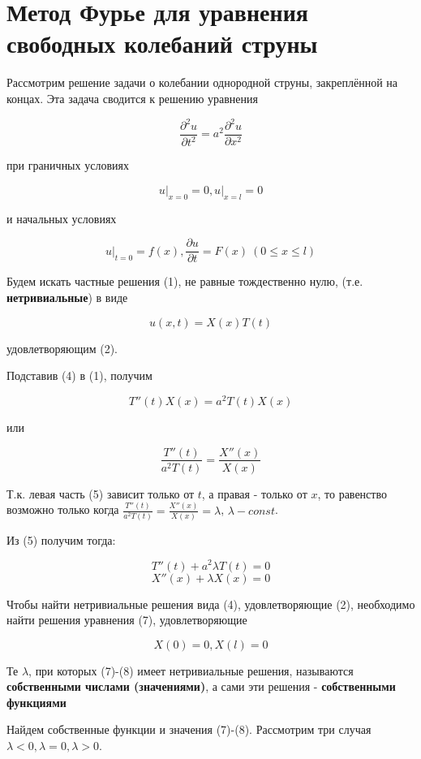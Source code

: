 \section{Метод Фурье для уравнения свободных колебаний струны}

Рассмотрим решение задачи о колебании однородной струны, закреплённой на концах. Эта задача сводится к решению уравнения

\[
	\frac{\partial^2 u}{\partial t^2} = a^2 \frac{\partial^2 u}{\partial x^2} \tag{1}
\]

при граничных условиях

\[
	\left. u\right|_{x=0} =0, \left. u\right|_{x=l}=0 \tag{2}
\]

и начальных условиях

\[
	\left. u\right|_{t=0}=f(x), \frac{\partial u}{\partial t} = F(x) ~ (0 \le x \le l) \tag{3}
\]

Будем искать частные решения (1), не равные тождественно нулю, (т.е. \textbf{нетривиальные}) в виде

\[
	u(x, t)=X(x)T(t) \tag{4}
\]

удовлетворяющим (2).

Подставив (4) в (1), получим

\[
	T''(t) X(x) = a^2 T(t) X(x)
\]

или

\[
	\frac{T''(t)}{a^2 T(t)} = \frac{X''(x)}{X(x)} \tag{5}
\]

Т.к. левая часть (5) зависит только от $t$, а правая - только от $x$, то равенство возможно только когда $\frac{T''(t)}{a^2 T(t)}=\frac{X''(x)}{X(x)}=\lambda$, $\lambda - const$.

Из (5) получим тогда:

\[
	T''(t) + a^2 \lambda T(t)=0 \tag{6}
\]
\[
	X''(x) + \lambda X(x) = 0 \tag{7}
\]

Чтобы найти нетривиальные решения вида (4), удовлетворяющие (2), необходимо найти решения уравнения (7), удовлетворяющие

\[
	X(0)=0, X(l)=0 \tag{8}
\]

Те $\lambda$, при которых (7)-(8) имеет нетривиальные решения, называются \textbf{собственными числами (значениями)}, а сами эти решения - \textbf{собственными функциями}

Найдем собственные функции и значения (7)-(8). Рассмотрим три случая $\lambda<0, \lambda=0, \lambda>0$.


